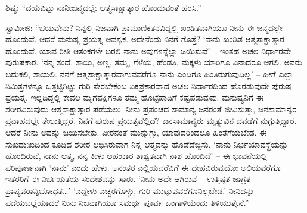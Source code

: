  ಶಿಷ್ಯ: “ದಯವಿಟ್ಟು ನಾನೀಜನ್ಮದಲ್ಲೇ ಆತ್ಮಸಾಕ್ಷಾತ್ಕಾರ ಹೊಂದುವಂತೆ ಹರಸಿ.” 

 ಸ್ವಾಮೀಜಿ: “ಭಯವೇನು? ನಿನ್ನಲ್ಲಿ ನಿಜವಾಗಿ ಪ್ರಾಮಾಣಿಕತನವಿದ್ದಲ್ಲಿ ಖಂಡಿತವಾಗಿಯೂ ನೀನು ಈ ಜನ್ಮದಲ್ಲೇ ಹೊಂದುವೆ. ಆದರೆ ಮನುಷ್ಯ ಪ್ರಯತ್ನ ಆವಶ್ಯಕ. ಅದೇನೆಂದು ನಿನಗೆ ಗೊತ್ತೆ? ‘ನಾನು ಖಂಡಿತ ಆತ್ಮಸಾಕ್ಷಾತ್ಕಾರ ಹೊಂದುವೆ. ಯಾವ ರೀತಿ ಆತಂಕಗಳೇ ಬರಲಿ ನಾನು ಅವುಗಳನ್ನೆಲ್ಲಾ ಜಯಿಸುವೆ’ – ಇಂತಹ ಅಚಲ ನಿರ್ಧಾರವೇ ಪುರುಷಕಾರ. ‘ನನ್ನ ತಂದೆ, ತಾಯಿ, ಅಣ್ಣ, ತಮ್ಮ, ಗೆಳೆಯ, ಹೆಂಡತಿ, ಮಕ್ಕಳು ಯಾರಿಗೂ ಏನಾದರೂ ಆಗಲಿ. ಅವರು ಬದುಕಲಿ, ಸಾಯಲಿ. ನನಗೆ ಆತ್ಮಸಾಕ್ಷಾತ್ಕಾರವಾಗುವವರೆಗೂ ನಾನು ಎಂದಿಗೂ ಹಿಂತಿರುಗುವುದಿಲ್ಲ’ – ಹೀಗೆ ಎಲ್ಲಾ ನಿಮಿತ್ತಗಳನ್ನೂ ಒತ್ತಟ್ಟಿಗಿಟ್ಟು ಗುರಿ ಸೇರಬೇಕೆಂಬ ಏಕಪ್ರಕಾರವಾದ ಅಚಲ ನಿರ್ಧಾರದಿಂದ ಹೊರಡುವುದೇ ಪುರುಷ ಪ್ರಯತ್ನ. ಇಲ್ಲದಿದ್ದಲ್ಲಿ ಕೇವಲ ಮೃಗಪಕ್ಷಿಗಳೂ ತಮ್ಮ ಹೊಟ್ಟೆಪಾಡಿಗೆ ಕಷ್ಟಪಡುವುವು. ಮನುಷ್ಯನಿಗೆ ಈ ಶರೀರವಿರುವುದು ಆತ್ಮಸಾಕ್ಷಾತ್ಕಾರ ಪಡೆಯಲು. ನೀನು ಪ್ರಪಂಚದ ಸಾಮಾನ್ಯ ಜನರಂತೆ ಜೀವಿಸುತ್ತಾ, ಜನಸಾಮಾನ್ಯರ ಪ್ರವಾಹದಲ್ಲೇ ತೇಲುತ್ತಿದ್ದರೆ, ನಿನಗೆ ಪುರುಷ ಪ್ರಯತ್ನವೆಲ್ಲಿದೆ? ಜನಸಾಮಾನ್ಯರು ಮೃತ್ಯುವಿನ ದವಡೆಗೆ ನುಗ್ಗುತ್ತಿದ್ದಾರೆ. ಆದರೆ ನೀನು ಅದನ್ನು ಜಯಿಸಬೇಕು. ವೀರನಂತೆ ಮುನ್ನುಗ್ಗು, ಯಾವುದರಿಂದಲೂ ಹಿಂತೆಗೆಯಬೇಡ. ಈ ಸುಖದುಃಖದಿಂದ ಕೂಡಿದ ಶರೀರ ಲಭಿಸಿರುವಾಗ ನಿನ್ನ ಆತ್ಮವನ್ನು ಹೊಡೆದೆಬ್ಬಿಸು. ‘ನಾನು ನಿರ್ಭಯಾವಸ್ಥೆಯನ್ನು ಹೊಂದಿರುವೆ, ನಾನು ಆತ್ಮ, ನನ್ನ ಕೀಳು ಅಹಂಕಾರ ಶಾಶ್ವತವಾಗಿ ನಾಶ ಹೊಂದಿದೆ’ – ಈ ಭಾವನೆಯಲ್ಲಿ ಪರಿಪೂರ್ಣನಾಗಿ ‘ನಾನು’ ಎಂದು ಹೇಳು. ಅನಂತರ ಎಲ್ಲಿಯವರೆವಿಗೆ ಈ ದೇಹವಿರುವುದೋ ಅಲಿಯವರೆಗೂ ಇತರರಿಗೆ ಈ ನಿರ್ಭಯತೆಯ ಸಂದೇಶವನ್ನು ಸಾರು. ‘ನೀನು ಅದೇ ಆಗಿರುವೆ – ಉತ್ತಿಷ್ಠತ ಜಾಗ್ರತ ಪ್ರಾಪ್ಯವರಾನ್ನಿಬೋಧತ…’ ‘ಎದ್ದೇಳು ಎಚ್ಚರಗೊಳ್ಳು, ಗುರಿ ಮುಟ್ಟುವವರೆಗೂ‌ನಿಲ್ಲಬೇಡ.’ ನೀನಿದನ್ನು ಪಡೆಯಬಲ್ಲೆಯಾದರೆ ನೀನು ನಿಜವಾಗಿಯೂ ಸಮರ್ಥ ಪೂರ್ವ ಬಂಗಾಳಿಯೆಂದು ತಿಳಿಯುತ್ತೇನೆ.” 

